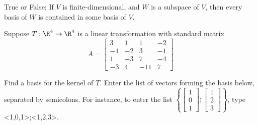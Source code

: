 \endedxproblem


True or False: If $V$ is finite-dimensional, and $W$ is a subspace of $V$, then every basis of $W$ is contained in some basis of $V$.  



\endedxproblem



\endedxvertical




Suppose $T: \R^4 \rightarrow \R^4$ is a linear transformation with standard matrix
\[A = 
\left[ \begin{array}{cccc}    
3 & 1 & 1 & -2  \\
-1 & -2 & 3 & -1  \\
1 & -3 & 7 & -4  \\
-3 & 4 & -11 & 7 
\end{array}
\right]
 \]



Find a basis for the kernel of $T$.  
Enter the list of vectors forming the basis below, separated by semicolons.  For instance, 
to enter the list $\left\{\left[\begin{array}{c} 1 \\ 0 \\ 1
\end{array} \right]; \left[\begin{array}{c} 1 \\ 2 \\ 3
\end{array} \right] \right\}$, type <1,0,1>;<1,2,3>.  








